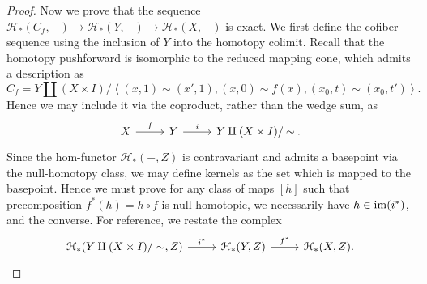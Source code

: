 \begin{proof}
	Now we prove that the sequence $\mathcal{H} _*(C_f,-)\to \mathcal{H}_*(Y,-)\to \mathcal{H} _*(X,-)$ is exact. We first define the cofiber sequence using the inclusion of $Y$ into the homotopy colimit. Recall that the homotopy pushforward is isomorphic to the reduced mapping cone, which admits a description as
	\[
		C_f=Y\amalg (X\times I) / \left\langle (x,1)\sim (x',1),(x,0)\sim f(x),(x_0,t)\sim (x_0,t') \right\rangle 
	.\]
	Hence we may include it via the coproduct, rather than the wedge sum, as
	\[\begin{tikzcd}[row sep = 2.5em, column sep = 2.5em]
	X\ar[" f ", r]  & Y\ar[" i ", r]  & Y\amalg (X\times I) / \tildesim .
	\end{tikzcd}\]
	Since the hom-functor $\mathcal{H} _*(-,Z)$ is contravariant and admits a basepoint via the null-homotopy class, we may define kernels as the set which is mapped to the basepoint. Hence we must prove for any class of maps $[h]$ such that precomposition $f^*(h)=h\circ f$ is null-homotopic, we necessarily have $h\in\operatorname{im}(i^*)$, and the converse. For reference, we restate the complex
	\[\begin{tikzcd}[row sep = 2.5em, column sep = 2.5em]
	\mathcal{H}_* (Y\amalg (X\times I) /\sim ,Z)\ar[" i^* ", r]  & \mathcal{H} _*(Y,Z)\ar[" f^* ", r]  & \mathcal{H} _*(X,Z).
	\end{tikzcd}\]


\end{proof}
